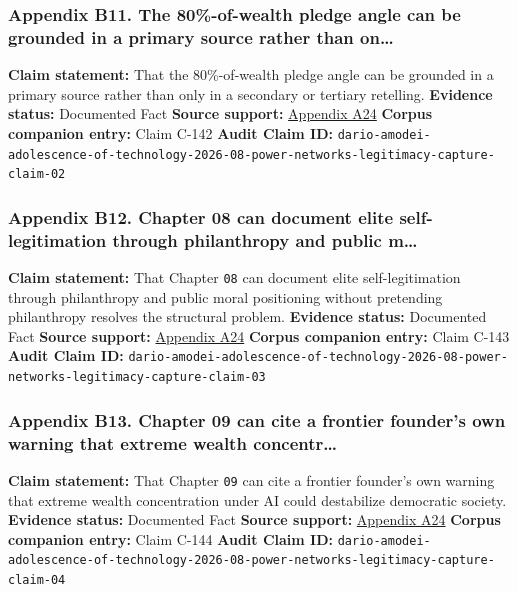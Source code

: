 \documentclass[
  american,
  11pt,
  letterpaper,
]{article}
\begin{document}
\subsubsection{Appendix B11. The 80\%-of-wealth pledge angle can be
grounded in a primary source rather than
on\ldots{}}\label{appendix-b11-the-80-of-wealth-pledge-angle-can-be-grounded-in-a-primary-source-rather-than-on}

\textbf{Claim statement:} That the 80\%-of-wealth pledge angle can be
grounded in a primary source rather than only in a secondary or tertiary
retelling. \textbf{Evidence status:} Documented Fact \textbf{Source
support:} \hyperref[appendix-a24-the-adolescence-of-technology]{Appendix
A24} \textbf{Corpus companion entry:} Claim C-142 \textbf{Audit Claim
ID:}
\texttt{dario-amodei-adolescence-of-technology-2026-08-power-networks-legitimacy-capture-claim-02}

\subsubsection{Appendix B12. Chapter 08 can document elite
self-legitimation through philanthropy and public
m\ldots{}}\label{appendix-b12-chapter-08-can-document-elite-self-legitimation-through-philanthropy-and-public-m}

\textbf{Claim statement:} That Chapter \texttt{08} can document elite
self-legitimation through philanthropy and public moral positioning
without pretending philanthropy resolves the structural problem.
\textbf{Evidence status:} Documented Fact \textbf{Source support:}
\hyperref[appendix-a24-the-adolescence-of-technology]{Appendix A24}
\textbf{Corpus companion entry:} Claim C-143 \textbf{Audit Claim ID:}
\texttt{dario-amodei-adolescence-of-technology-2026-08-power-networks-legitimacy-capture-claim-03}

\subsubsection{Appendix B13. Chapter 09 can cite a frontier founder's
own warning that extreme wealth
concentr\ldots{}}\label{appendix-b13-chapter-09-can-cite-a-frontier-founder-s-own-warning-that-extreme-wealth-concentr}

\textbf{Claim statement:} That Chapter \texttt{09} can cite a frontier
founder's own warning that extreme wealth concentration under AI could
destabilize democratic society. \textbf{Evidence status:} Documented
Fact \textbf{Source support:}
\hyperref[appendix-a24-the-adolescence-of-technology]{Appendix A24}
\textbf{Corpus companion entry:} Claim C-144 \textbf{Audit Claim ID:}
\texttt{dario-amodei-adolescence-of-technology-2026-08-power-networks-legitimacy-capture-claim-04}
\end{document}
